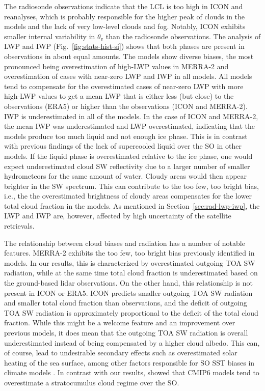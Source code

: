 \documentclass[draft]{agujournal2019}
\begin{document}
The radiosonde observations indicate that the LCL is too high in ICON and reanalyses, which is probably responsible for the higher peak of clouds in the models and the lack of very low-level clouds and fog. Notably, ICON exhibits smaller internal variability in $\theta_v$ than the radiosonde observations. The analysis of LWP and IWP (Fig.~\ref{fig:stats-hist-si}) shows that both phases are present in observations in about equal amounts. The models show diverse biases, the most pronounced being overestimation of high-LWP values in MERRA-2 and overestimation of cases with near-zero LWP and IWP in all models. All models tend to compensate for the overestimated cases of near-zero LWP with more high-LWP values to get a mean LWP that is either less (but close) to the observations (ERA5) or higher than the observations (ICON and MERRA-2). IWP is underestimated in all of the models. In the case of ICON and MERRA-2, the mean IWP was underestimated and LWP overestimated, indicating that the models produce too much liquid and not enough ice phase. This is in contrast with previous findings of the lack of supercooled liquid over the SO in other models. If the liquid phase is overestimated relative to the ice phase, one would expect underestimated cloud SW reflectivity due to a larger number of smaller hydrometeors for the same amount of water. Cloudy areas would then appear brighter in the SW spectrum. This can contribute to the too few, too bright bias, i.e., the the overestimated brightness of cloudy areas compensates for the lower total cloud fraction in the models. As mentioned in Section~\ref{sec:rad-lwp-iwp}, the LWP and IWP are, however, affected by high uncertainty of the satellite retrievals.

The relationship between cloud biases and radiation has a number of notable features. MERRA-2 exhibits the too few, too bright bias previously identified in models. In our results, this is characterized by overestimated outgoing TOA SW radiation, while at the same time total cloud fraction is underestimated based on the ground-based lidar observations. On the other hand, this relationship is not present in ICON or ERA5. ICON predicts smaller outgoing TOA SW radiation and smaller total cloud fraction than observations, and the deficit of outgoing TOA SW radiation is approximately proportional to the deficit of the total cloud fraction. While this might be a welcome feature and an improvement over previous models, it does mean that the outgoing TOA SW radiation is overall underestimated instead of being compensated by a higher cloud albedo. This can, of course, lead to undesirable secondary effects such as overestimated solar heating of the sea surface, among other factors responsible for SO SST biases in climate models \cite{zhang2023,luo2023,hyder2018}. In contrast with our results,  showed that CMIP6 models tend to overestimate a stratocumulus cloud regime over the SO.
\end{document}
